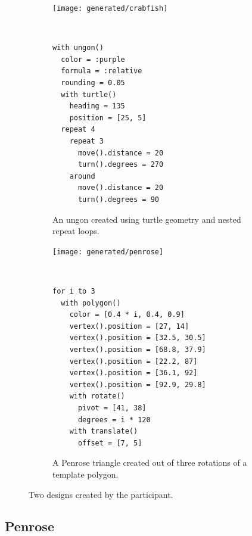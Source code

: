 \begin{figure}
\hfill%
\begin{subfigure}{0.45\linewidth}%
\centering
\begin{minipage}{\linewidth}%
\texttt{[image: generated/crabfish]}
\end{minipage}%
\\
\vspace{0.5em}
\begin{minipage}{0.57\linewidth}%
\small
\begin{Verbatim}
with ungon()
  color = :purple
  formula = :relative
  rounding = 0.05
  with turtle()
    heading = 135
    position = [25, 5]
  repeat 4
    repeat 3
      move().distance = 20
      turn().degrees = 270
    around
      move().distance = 20
      turn().degrees = 90
\end{Verbatim}
\end{minipage}%
\caption{An ungon created using turtle geometry and nested repeat loops.}
\label{figure:crabfish}
\end{subfigure}%
\hfill%
\begin{subfigure}{0.45\linewidth}%
\centering
\begin{minipage}{\linewidth}%
\texttt{[image: generated/penrose]}
\end{minipage}%
\\
\vspace{0.5em}
\begin{minipage}{0.77\linewidth}%
\small
\begin{Verbatim}
for i to 3
  with polygon()
    color = [0.4 * i, 0.4, 0.9]
    vertex().position = [27, 14]
    vertex().position = [32.5, 30.5]
    vertex().position = [68.8, 37.9]
    vertex().position = [22.2, 87]
    vertex().position = [36.1, 92]
    vertex().position = [92.9, 29.8]
    with rotate()
      pivot = [41, 38]
      degrees = i * 120
    with translate()
      offset = [7, 5]
\end{Verbatim}
\end{minipage}%
\caption{A Penrose triangle created out of three rotations of a template polygon.}
\label{figure:crabfish}
\end{subfigure}%
\hfill%
\caption{Two designs created by the participant.}
\label{figure:penrose}
\end{figure}

\subsection{Penrose}

